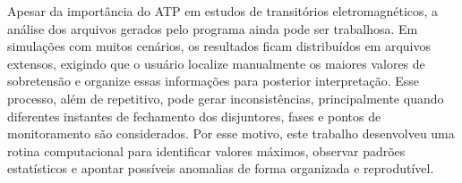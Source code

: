 \documentclass[
	12pt,				%
	openright,			%
	oneside,			%
	a4paper,			%
	chapter=TITLE,		%
	section=TITLE,		%
	subsection=TITLE,	%
	subsubsection=TITLE,%
	english,			%
	brazilian			%
	]{abntex2}
\theoremstyle{definition}
\begin{document}

Apesar da importância do ATP em estudos de transitórios eletromagnéticos, a análise dos arquivos gerados pelo programa ainda pode ser trabalhosa. Em simulações com muitos cenários, os resultados ficam distribuídos em arquivos extensos, exigindo que o usuário localize manualmente os maiores valores de sobretensão e organize essas informações para posterior interpretação. Esse processo, além de repetitivo, pode gerar inconsistências, principalmente quando diferentes instantes de fechamento dos disjuntores, fases e pontos de monitoramento são considerados. Por esse motivo, este trabalho desenvolveu uma rotina computacional para identificar valores máximos, observar padrões estatísticos e apontar possíveis anomalias de forma organizada e reprodutível.
\end{document}
